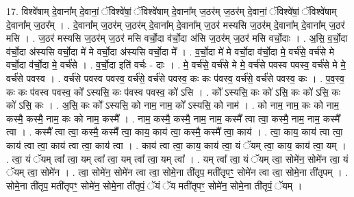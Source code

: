 \documentclass[17pt]{extarticle}
\begin{document}
17. विश्वे॑षाम् दे॒वाना᳚म् दे॒वानां॒ ॅविश्वे॑षां॒ ॅविश्वे॑षाम् दे॒वाना᳚म् ज॒ठर॑म् ज॒ठर॑म् दे॒वानां॒ ॅविश्वे॑षां॒ ॅविश्वे॑षाम् दे॒वाना᳚म् ज॒ठर᳚म् । . दे॒वाना᳚म् ज॒ठर॑म् ज॒ठर॑म् दे॒वाना᳚म् दे॒वाना᳚म् ज॒ठर॑ मस्यसि ज॒ठर॑म् दे॒वाना᳚म् दे॒वाना᳚म् ज॒ठर॑ मसि । . ज॒ठर॑ मस्यसि ज॒ठर॑म् ज॒ठर॑ मसि वर्चो॒दा व॑र्चो॒दा अ॑सि ज॒ठर॑म् ज॒ठर॑ मसि वर्चो॒दाः । . अ॒सि॒ व॒र्चो॒दा व॑र्चो॒दा अ॑स्यसि वर्चो॒दा मे॑ मे वर्चो॒दा अ॑स्यसि वर्चो॒दा मे᳚ । . व॒र्चो॒दा मे॑ मे वर्चो॒दा व॑र्चो॒दा मे॒ वर्च॑से॒ वर्च॑से मे वर्चो॒दा व॑र्चो॒दा मे॒ वर्च॑से । . व॒र्चो॒दा इति॑ वर्चः - दाः । . मे॒ वर्च॑से॒ वर्च॑से मे मे॒ वर्च॑से पवस्व पवस्व॒ वर्च॑से मे मे॒ वर्च॑से पवस्व । . वर्च॑से पवस्व पवस्व॒ वर्च॑से॒ वर्च॑से पवस्व॒ कः कः प॑वस्व॒ वर्च॑से॒ वर्च॑से पवस्व॒ कः । . प॒व॒स्व॒ कः कः प॑वस्व पवस्व॒ को᳚ ऽस्यसि॒ कः प॑वस्व पवस्व॒ को॑ ऽसि । . को᳚ ऽस्यसि॒ कः को॑ ऽसि॒ कः को॑ ऽसि॒ कः को॑ ऽसि॒ कः । . अ॒सि॒ कः को᳚ ऽस्यसि॒ को नाम॒ नाम॒ को᳚ ऽस्यसि॒ को नाम॑ । . को नाम॒ नाम॒ कः को नाम॒ कस्मै॒ कस्मै॒ नाम॒ कः को नाम॒ कस्मै᳚ । . नाम॒ कस्मै॒ कस्मै॒ नाम॒ नाम॒ कस्मै᳚ त्वा त्वा॒ कस्मै॒ नाम॒ नाम॒ कस्मै᳚ त्वा । . कस्मै᳚ त्वा त्वा॒ कस्मै॒ कस्मै᳚ त्वा॒ काय॒ काय॑ त्वा॒ कस्मै॒ कस्मै᳚ त्वा॒ काय॑ । . त्वा॒ काय॒ काय॑ त्वा त्वा॒ काय॑ त्वा त्वा॒ काय॑ त्वा त्वा॒ काय॑ त्वा । . काय॑ त्वा त्वा॒ काय॒ काय॑ त्वा॒ यं ॅयम् त्वा॒ काय॒ काय॑ त्वा॒ यम् । . त्वा॒ यं ॅयम् त्वा᳚ त्वा॒ यम् त्वा᳚ त्वा॒ यम् त्वा᳚ त्वा॒ यम् त्वा᳚ । . यम् त्वा᳚ त्वा॒ यं ॅयम् त्वा॒ सोमे॑न॒ सोमे॑न त्वा॒ यं ॅयम् त्वा॒ सोमे॑न । . त्वा॒ सोमे॑न॒ सोमे॑न त्वा त्वा॒ सोमे॒ना ती॑तृप॒ मती॑तृपꣳ॒॒ सोमे॑न त्वा त्वा॒ सोमे॒ना ती॑तृपम् । . सोमे॒ना ती॑तृप॒ मती॑तृपꣳ॒॒ सोमे॑न॒ सोमे॒ना ती॑तृपं॒ ॅयं ॅय मती॑तृपꣳ॒॒ सोमे॑न॒ सोमे॒ना ती॑तृपं॒ ॅयम् । \newline
\end{document}
